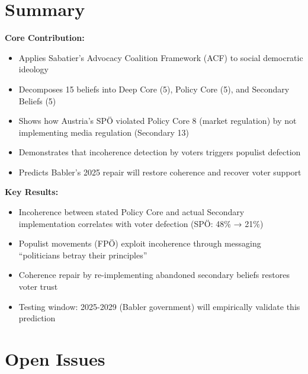 
\section{Summary}
\label{sec:cj-summary}

\begin{tcolorbox}[colback=green!10!white, colframe=green!75!black,
    title=Appendix CJ: Summary]

\textbf{Core Contribution:}
\begin{itemize}[nosep]
    \item Applies Sabatier's Advocacy Coalition Framework (ACF) to social democratic ideology
    \item Decomposes 15 beliefs into Deep Core (5), Policy Core (5), and Secondary Beliefs (5)
    \item Shows how Austria's SPÖ violated Policy Core 8 (market regulation) by not implementing media regulation (Secondary 13)
    \item Demonstrates that incoherence detection by voters triggers populist defection
    \item Predicts Babler's 2025 repair will restore coherence and recover voter support
\end{itemize}

\textbf{Key Results:}
\begin{itemize}[nosep]
    \item Incoherence between stated Policy Core and actual Secondary implementation correlates with voter defection (SPÖ: 48\% → 21\%)
    \item Populist movements (FPÖ) exploit incoherence through messaging ``politicians betray their principles''
    \item Coherence repair by re-implementing abandoned secondary beliefs restores voter trust
    \item Testing window: 2025-2029 (Babler government) will empirically validate this prediction
\end{itemize}

\end{tcolorbox}


\section{Open Issues}
\label{sec:cj-open}

